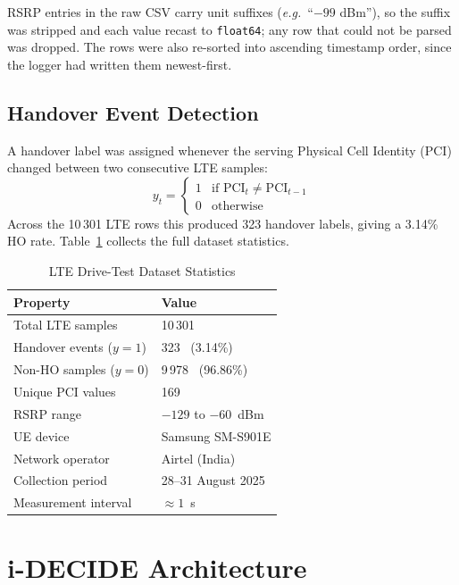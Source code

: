 \documentclass[journal]{IEEEtran}
\begin{document}
RSRP entries in the raw CSV carry unit suffixes (\emph{e.g.}\ ``$-99$ dBm''),
so the suffix was stripped and each value recast to \texttt{float64}; any
row that could not be parsed was dropped. The rows were also re-sorted
into ascending timestamp order, since the logger had written them
newest-first.

\subsection{Handover Event Detection}
\label{sec:hodetect}

A handover label was assigned whenever the serving Physical Cell Identity
(PCI) changed between two consecutive LTE samples:
\begin{equation}
  y_t =
  \begin{cases}
    1 & \text{if } \mathrm{PCI}_{t} \neq \mathrm{PCI}_{t-1} \\
    0 & \text{otherwise}
  \end{cases}
  \label{eq:ho}
\end{equation}
Across the 10\,301 LTE rows this produced 323 handover labels, giving a
3.14\% HO rate. Table~\ref{tab:stats} collects the full dataset statistics.

\begin{table}[!t]
\caption{LTE Drive-Test Dataset Statistics}
\label{tab:stats}
\centering
\begin{tabular}{ll}
\toprule
\textbf{Property} & \textbf{Value} \\
\midrule
Total LTE samples          & 10\,301 \\
Handover events ($y{=}1$)  & 323 \ (3.14\%) \\
Non-HO samples ($y{=}0$)   & 9\,978 \ (96.86\%) \\
Unique PCI values           & 169 \\
RSRP range                  & $-129$ to $-60$~dBm \\
UE device                   & Samsung SM-S901E \\
Network operator            & Airtel (India) \\
Collection period           & 28--31 August 2025 \\
Measurement interval        & $\approx 1$~s \\
\bottomrule
\end{tabular}
\end{table}

\section{i-DECIDE Architecture}
\label{sec:arch}
\end{document}

